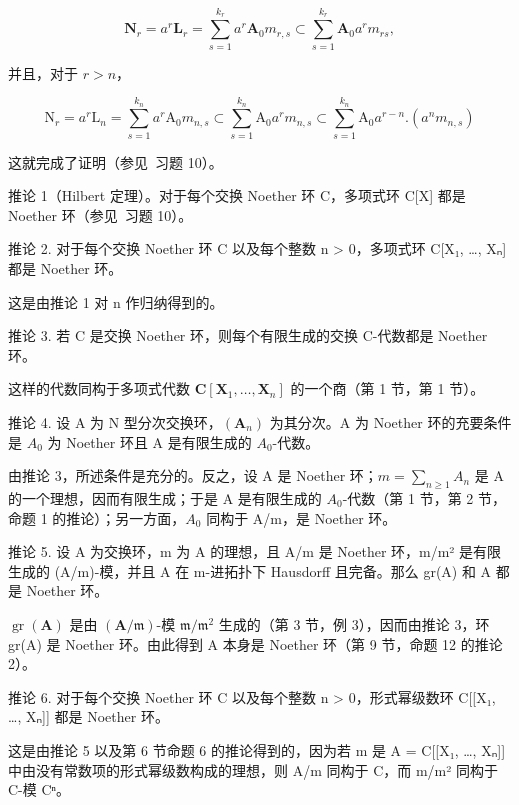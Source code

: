 \[
\mathbf {N} _ {r} = a ^ {r} \mathbf {L} _ {r} = \sum_ {s = 1} ^ {k _ {r}} a ^ {r} \mathbf {A} _ {0} m _ {r, s} \subset \sum_ {s = 1} ^ {k _ {r}} \mathbf {A} _ {0} a ^ {r} m _ {r s},
\]

并且，对于 \(r > n\)，

\[
\mathrm{N} _ {r} = a ^ {r} \mathrm{L} _ {n} = \sum_ {s = 1} ^ {k _ {n}} a ^ {r} \mathrm{A} _ {0} m _ {n, s} \subset \sum_ {s = 1} ^ {k _ {n}} \mathrm{A} _ {0} a ^ {r} m _ {n, s} \subset \sum_ {s = 1} ^ {k _ {n}} \mathrm{A} _ {0} a ^ {r - n}. (a ^ {n} m _ {n, s})
\]

	这就完成了证明（参见~习题 10）。

	推论 1（Hilbert 定理）。对于每个交换 Noether 环 C，多项式环 C{[}X{]} 都是 Noether 环（参见~习题 10）。

	推论 2. 对于每个交换 Noether 环 C 以及每个整数 n \textgreater{} 0，多项式环 C{[}X₁, \ldots, Xₙ{]} 都是 Noether 环。

	这是由推论 1 对 n 作归纳得到的。

	推论 3. 若 C 是交换 Noether 环，则每个有限生成的交换 C-代数都是 Noether 环。

	这样的代数同构于多项式代数 \(\mathbf{C}[\mathbf{X}_1,\ldots ,\mathbf{X}_n]\) 的一个商（第 1 节，第 1 节）。

	推论 4. 设 A 为 N 型分次交换环，\((\mathbf{A}_{n})\) 为其分次。A 为 Noether 环的充要条件是 \(A_{0}\) 为 Noether 环且 A 是有限生成的 \(A_{0}\)-代数。

	由推论 3，所述条件是充分的。反之，设 A 是 Noether 环；\(m = \sum_{n \geqslant 1} A_n\) 是 A 的一个理想，因而有限生成；于是 A 是有限生成的 \(A_0\)-代数（第 1 节，第 2 节，命题 1 的推论）；另一方面，\(A_0\) 同构于 A/m，是 Noether 环。

	推论 5. 设 A 为交换环，m 为 A 的理想，且 A/m 是 Noether 环，m/m² 是有限生成的 (A/m)-模，并且 A 在 m-进拓扑下 Hausdorff 且完备。那么 gr(A) 和 A 都是 Noether 环。

	\(\operatorname{gr}(\mathbf{A})\) 是由 \((\mathbf{A} / \mathfrak{m})\)-模 \(\mathfrak{m} / \mathfrak{m}^2\) 生成的（第 3 节，例 3），因而由推论 3，环 gr(A) 是 Noether 环。由此得到 A 本身是 Noether 环（第 9 节，命题 12 的推论 2）。

	推论 6. 对于每个交换 Noether 环 C 以及每个整数 n \textgreater{} 0，形式幂级数环 C{[}{[}X₁, \ldots, Xₙ{]}{]} 都是 Noether 环。

	这是由推论 5 以及第 6 节命题 6 的推论得到的，因为若 m 是 A = C{[}{[}X₁, \ldots, Xₙ{]}{]} 中由没有常数项的形式幂级数构成的理想，则 A/m 同构于 C，而 m/m² 同构于 C-模 Cⁿ。

